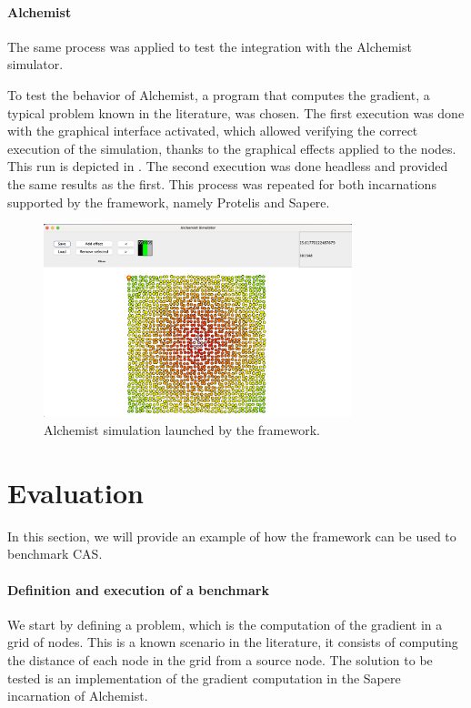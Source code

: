 \documentclass[12pt,a4paper,openright,twoside]{book}
\begin{document}
\paragraph*{Alchemist}
The same process was applied to test the integration with the Alchemist simulator.

To test the behavior of Alchemist, a program that computes the gradient, a typical problem known in the literature, was chosen. 
The first execution was done with the graphical interface activated, which allowed verifying the correct execution of the simulation, thanks to the graphical effects applied to the nodes.
This run is depicted in .
The second execution was done headless and provided the same results as the first. This process was repeated for both incarnations supported by the framework, namely Protelis and Sapere.

\begin{figure}[h!]
  \centering
  \includegraphics[width=0.8\textwidth]{figures/gradient-execution.png}
  \caption{Alchemist simulation launched by the framework.}
  \label{fig:alchemist-sim}
\end{figure}

\section{Evaluation}

In this section, we will provide an example of how the framework can be used to benchmark \ac*{CAS}.

\paragraph*{Definition and execution of a benchmark}

We start by defining a problem, which is the computation of the gradient in a grid of nodes.
This is a known scenario in the literature, it consists of computing the distance of each node in the grid from a source node.
The solution to be tested is an implementation of the gradient computation in the Sapere incarnation of Alchemist.
\end{document}
